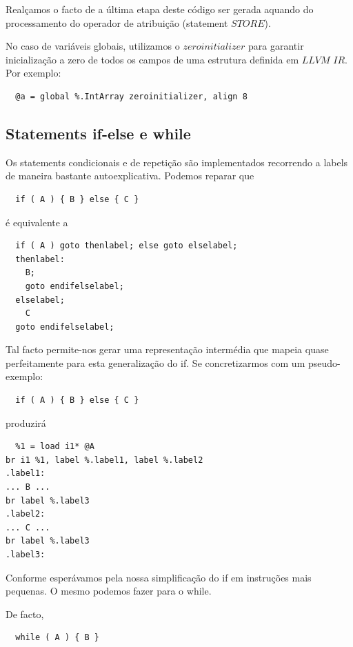 \documentclass[11pt,a4paper]{article}
\begin{document}
Realçamos o facto de a última etapa deste código ser gerada aquando do processamento do operador de atribuição (statement $STORE$).

No caso de variáveis globais, utilizamos o $zeroinitializer$ para garantir inicialização a zero de todos os campos de uma estrutura definida em $LLVM$ $IR$. Por exemplo:

\begin{lstlisting}
  @a = global %.IntArray zeroinitializer, align 8
\end{lstlisting}

\subsection{Statements if-else e while}

Os statements condicionais e de repetição são implementados recorrendo a labels de maneira bastante autoexplicativa. Podemos reparar que

\begin{lstlisting}
  if ( A ) { B } else { C }
\end{lstlisting}

é equivalente a

\begin{lstlisting}
  if ( A ) goto thenlabel; else goto elselabel;
  thenlabel:
    B;
    goto endifelselabel;
  elselabel;
    C
  goto endifelselabel;
\end{lstlisting}

Tal facto permite-nos gerar uma representação intermédia que mapeia quase perfeitamente para esta generalização do if. Se concretizarmos com um pseudo-exemplo:

\begin{lstlisting}
  if ( A ) { B } else { C }
\end{lstlisting}

produzirá

\begin{lstlisting}
  %1 = load i1* @A
br i1 %1, label %.label1, label %.label2
.label1:
... B ...
br label %.label3
.label2:
... C ...
br label %.label3
.label3:
\end{lstlisting}

Conforme esperávamos pela nossa simplificação do if em instruções mais pequenas. O mesmo podemos fazer para o while.

De facto,

\begin{lstlisting}
  while ( A ) { B }
\end{lstlisting}
\end{document}
